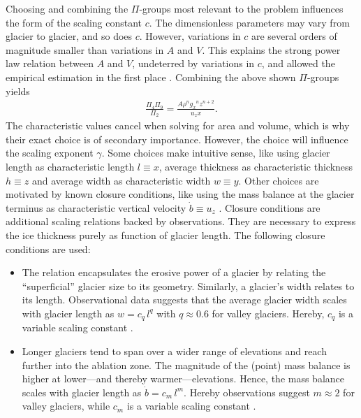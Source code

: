             Choosing and combining the $\Pi$-groups most relevant to the problem influences the form of the scaling constant $c$. The dimensionless parameters may vary from glacier to glacier, and so does $c$. However,  variations in $c$ are several orders of magnitude smaller than variations in $A$ and $V$. This explains the strong power law relation between $A$ and $V$, undeterred by variations in $c$, and allowed the empirical estimation in the first place \citep{Bahr2015}. Combining the above shown $\Pi$-groups yields
            \begin{align}\label{eq:pi_groups_combi}
                \frac{\Pi_4 \Pi_9}{\Pi_2} = \frac{A\rho^n{g_x}^nz^{n+2}}{u_z x}.
            \end{align}
            The characteristic values cancel when solving for area and volume, which is why their exact choice is of secondary importance. However, the choice will influence the scaling exponent $\gamma$. Some choices make intuitive sense, like using glacier length as characteristic length $l \equiv x$, average thickness as characteristic thickness $h \equiv z$ and average width as characteristic width $w \equiv y$. Other choices are motivated by known closure conditions, like using the mass balance at the glacier terminus as characteristic vertical velocity $\dot b \equiv u_z$ \citep{Bahr2015}. Closure conditions are additional scaling relations backed by observations. They are necessary to express the ice thickness purely as function of glacier length. The following closure conditions are used:
            \begin{itemize}
                \item The \vas{} relation encapsulates the erosive power of a glacier by relating the ``superficial'' glacier size to its geometry. Similarly, a glacier's width relates to its length. Observational data suggests that the average glacier width scales with glacier length as $w=c_q\, l^q$ with $q\approx 0.6$ for valley glaciers. Hereby, $c_q$ is a variable scaling constant \citep{Bahr1997a, Bahr2015}.
                \item Longer glaciers tend to span over a wider range of elevations and reach further into the ablation zone. The magnitude of the (point) mass balance is higher at lower---and thereby warmer---elevations. Hence, the mass balance scales with glacier length as $\dot b = c_m\, l^m$. Hereby observations suggest $m\approx 2$ for valley glaciers, while $c_m$ is a variable scaling constant \citep{Bahr1997b, Bahr2015}.
            \end{itemize}
